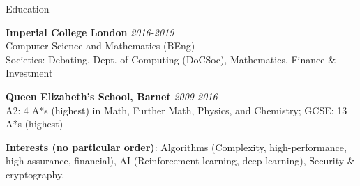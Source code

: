 \documentclass[10pt]{resume} %
\begin{document}

\begin{rSection}{Education}

{\bf Imperial College London} \hfill {\em 2016-2019} \\ 
Computer Science and Mathematics (BEng)\smallskip\\
Societies: Debating, Dept. of Computing (DoCSoc), Mathematics, Finance \& Investment

{\bf Queen Elizabeth's School, Barnet} \hfill {\em 2009-2016} \\ 
A2: 4 A*s (highest) in Math, Further Math, Physics, and Chemistry; GCSE: 13 A*s (highest)


\textbf{Interests (no particular order)}:
  Algorithms (Complexity, high-performance, high-assurance, financial),
  AI (Reinforcement learning, deep learning),
  Security \& cryptography.

\end{rSection}

\end{document}
